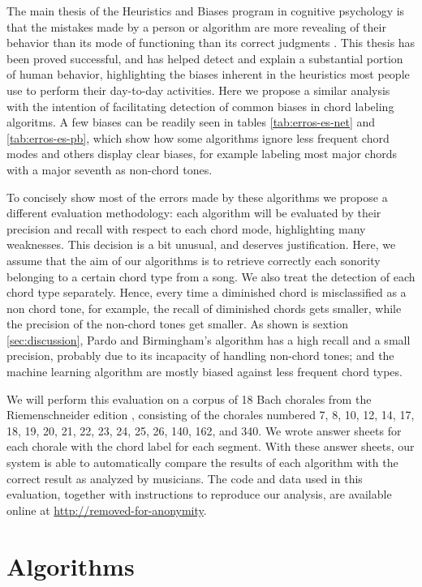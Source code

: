 \documentclass{article}
\begin{document}
The main thesis of the Heuristics and Biases program in cognitive
psychology is that the mistakes made by a person or algorithm are more
revealing of their behavior than its mode of functioning than its
correct judgments \cite{gilovich.ea02:heuristics}. This thesis has
been proved successful, and has helped detect and explain a
substantial portion of human behavior, highlighting the biases
inherent in the heuristics most people use to perform their day-to-day
activities. Here we propose a similar analysis with the intention of
facilitating detection of common biases in chord labeling algoritms. A
few biases can be readily seen in tables \ref{tab:erros-es-net} and
\ref{tab:erros-es-pb}, which show how some algorithms ignore less
frequent chord modes and others display clear biases, for example
labeling most major chords with a major seventh as non-chord tones.

To concisely show most of the errors made by these algorithms we
propose a different evaluation methodology: each algorithm will be
evaluated by their precision and recall with respect to each chord
mode, highlighting many weaknesses. This decision is a bit unusual,
and deserves justification. Here, we assume that the aim of our
algorithms is to retrieve correctly each sonority belonging to a
certain chord type from a song. We also treat the detection of each
chord type separately. Hence, every time a diminished chord is
misclassified as a non chord tone, for example, the recall of
diminished chords gets smaller, while the precision of the non-chord
tones get smaller. As shown is sextion \ref{sec:discussion}, Pardo and
Birmingham's algorithm has a high recall and a small precision,
probably due to its incapacity of handling non-chord tones; and the
machine learning algorithm are mostly biased against less frequent
chord types.

We will perform this evaluation on a corpus of 18 Bach chorales from
the Riemenschneider edition \cite{bach41:371}, consisting of the
chorales numbered 7, 8, 10, 12, 14, 17, 18, 19, 20, 21, 22, 23, 24,
25, 26, 140, 162, and 340. We wrote answer sheets for each chorale
with the chord label for each segment. With these answer sheets, our
system is able to automatically compare the results of each algorithm
with the correct result as analyzed by musicians. The code and data
used in this evaluation, together with instructions to reproduce our
analysis, are available online at \url{http://removed-for-anonymity}.

\section{Algorithms}
\label{sec:algorithms}
\end{document}
